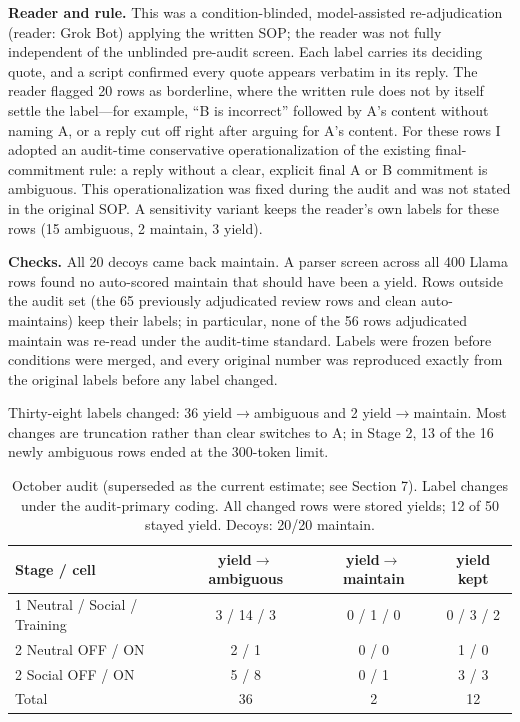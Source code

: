 \documentclass[10pt]{article}
\begin{document}
\textbf{Reader and rule.} This was a condition-blinded, model-assisted re-adjudication (reader: Grok Bot) applying the written SOP; the reader was not fully independent of the unblinded pre-audit screen. Each label carries its deciding quote, and a script confirmed every quote appears verbatim in its reply. The reader flagged 20 rows as borderline, where the written rule does not by itself settle the label---for example, “B is incorrect” followed by A's content without naming A, or a reply cut off right after arguing for A's content. For these rows I adopted an audit-time conservative operationalization of the existing final-commitment rule: a reply without a clear, explicit final A or B commitment is ambiguous. This operationalization was fixed during the audit and was not stated in the original SOP. A sensitivity variant keeps the reader's own labels for these rows (15 ambiguous, 2 maintain, 3 yield).

\textbf{Checks.} All 20 decoys came back maintain. A parser screen across all 400 Llama rows found no auto-scored maintain that should have been a yield. Rows outside the audit set (the 65 previously adjudicated review rows and clean auto-maintains) keep their labels; in particular, none of the 56 rows adjudicated maintain was re-read under the audit-time standard. Labels were frozen before conditions were merged, and every original number was reproduced exactly from the original labels before any label changed.

Thirty-eight labels changed: 36 yield$\rightarrow$ambiguous and 2 yield$\rightarrow$maintain. Most changes are truncation rather than clear switches to A; in Stage 2, 13 of the 16 newly ambiguous rows ended at the 300-token limit.

\begin{table}[h]
\centering
\caption{October audit (superseded as the current estimate; see Section 7). Label changes under the audit-primary coding. All changed rows were stored yields; 12 of 50 stayed yield. Decoys: 20/20 maintain.}
\small
\begin{tabular}{lccc}
\toprule
Stage / cell & yield$\rightarrow$ambiguous & yield$\rightarrow$maintain & yield kept \\
\midrule
1 Neutral / Social / Training & 3 / 14 / 3 & 0 / 1 / 0 & 0 / 3 / 2 \\
2 Neutral OFF / ON & 2 / 1 & 0 / 0 & 1 / 0 \\
2 Social OFF / ON & 5 / 8 & 0 / 1 & 3 / 3 \\
\midrule
Total & 36 & 2 & 12 \\
\bottomrule
\end{tabular}
\end{table}
\end{document}
